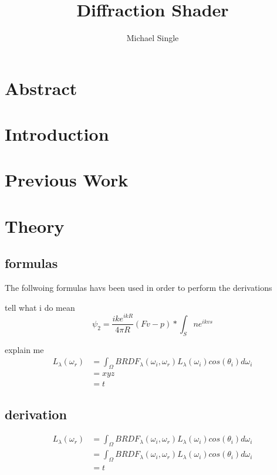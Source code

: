 \documentclass[12pt]{article}
\begin{document}
\title{Diffraction Shader}
\author{Michael Single}
\maketitle

\section{Abstract}
\section{Introduction}
\section{Previous Work}
\section{Theory}

\subsection{formulas}
The follwoing formulas havs been used in order to perform the derivations

tell what i do mean
\begin{equation} 
\psi_{2} = \frac{i k e^{ikR}}{4 \pi R}(Fv - p) * \int_S{ne^{ikvs}}
\end{equation}

explain me
\begin{align*}
L_{\lambda}(\omega_{r}) 
&= \int_{\Omega}{BRDF_{\lambda}(\omega_i, \omega_r) L_{\lambda}(\omega_i)cos(\theta_i) d\omega_i} \\
&= xyz \\
&= t
\end{align*}



\subsection{derivation}

\begin{align*}
L_{\lambda}(\omega_{r}) 
&= \int_{\Omega}{BRDF_{\lambda}(\omega_i, \omega_r) L_{\lambda}(\omega_i)cos(\theta_i) d\omega_i} \\
&= \int_{\Omega}{BRDF_{\lambda}(\omega_i, \omega_r) L_{\lambda}(\omega_i)cos(\theta_i) d\omega_i} \\
&= t
\end{align*}
\end{document}
